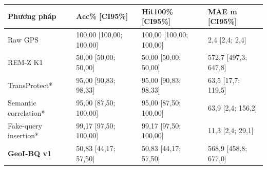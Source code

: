\par\smallskip\noindent\begin{tabularx}{\linewidth}{@{}P{3.1cm}XXX@{}}\toprule
\textbf{Phương pháp} & \textbf{Acc\% [CI95\%]} & \textbf{Hit100\% [CI95\%]} & \textbf{MAE m [CI95\%]} \\
\midrule
Raw GPS & 100{,}00 [100{,}00; 100{,}00] & 100{,}00 [100{,}00; 100{,}00] & 2{,}4 [2{,}4; 2{,}4] \\
REM-Z K1 & 50{,}00 [50{,}00; 50{,}00] & 50{,}00 [50{,}00; 50{,}00] & 572{,}7 [497{,}3; 647{,}8] \\
TransProtect* & 95{,}00 [90{,}83; 98{,}33] & 95{,}00 [90{,}83; 98{,}33] & 63{,}5 [17{,}7; 119{,}5] \\
Semantic correlation* & 95{,}00 [87{,}50; 100{,}00] & 95{,}00 [87{,}50; 100{,}00] & 63{,}9 [2{,}4; 156{,}2] \\
Fake-query insertion* & 99{,}17 [97{,}50; 100{,}00] & 99{,}17 [97{,}50; 100{,}00] & 11{,}3 [2{,}4; 29{,}1] \\
\textbf{GeoI-BQ v1} & 50{,}83 [44{,}17; 57{,}50] & 50{,}83 [44{,}17; 57{,}50] & 568{,}9 [458{,}8; 677{,}0] \\
\bottomrule\end{tabularx}\par\smallskip

